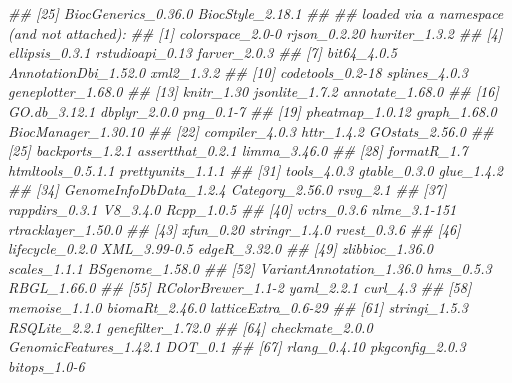 \documentclass[14pt,]{article}
\newcommand{\hlcom}[1]{\textcolor[rgb]{0.502,0.502,0.502}{\textit{#1}}}%
\newenvironment{Shaded}{\begin{myshaded}}{\end{myshaded}}
\newcommand{\DocumentationTok}[1]{\hlcom{#1}}
\begin{document}
\begin{Shaded}
\begin{Highlighting}[]
\DocumentationTok{\#\# [25] BiocGenerics\_0.36.0         BiocStyle\_2.18.1           }
\DocumentationTok{\#\# }
\DocumentationTok{\#\# loaded via a namespace (and not attached):}
\DocumentationTok{\#\#   [1] colorspace\_2.0{-}0         rjson\_0.2.20             hwriter\_1.3.2           }
\DocumentationTok{\#\#   [4] ellipsis\_0.3.1           rstudioapi\_0.13          farver\_2.0.3            }
\DocumentationTok{\#\#   [7] bit64\_4.0.5              AnnotationDbi\_1.52.0     xml2\_1.3.2              }
\DocumentationTok{\#\#  [10] codetools\_0.2{-}18         splines\_4.0.3            geneplotter\_1.68.0      }
\DocumentationTok{\#\#  [13] knitr\_1.30               jsonlite\_1.7.2           annotate\_1.68.0         }
\DocumentationTok{\#\#  [16] GO.db\_3.12.1             dbplyr\_2.0.0             png\_0.1{-}7               }
\DocumentationTok{\#\#  [19] pheatmap\_1.0.12          graph\_1.68.0             BiocManager\_1.30.10     }
\DocumentationTok{\#\#  [22] compiler\_4.0.3           httr\_1.4.2               GOstats\_2.56.0          }
\DocumentationTok{\#\#  [25] backports\_1.2.1          assertthat\_0.2.1         limma\_3.46.0            }
\DocumentationTok{\#\#  [28] formatR\_1.7              htmltools\_0.5.1.1        prettyunits\_1.1.1       }
\DocumentationTok{\#\#  [31] tools\_4.0.3              gtable\_0.3.0             glue\_1.4.2              }
\DocumentationTok{\#\#  [34] GenomeInfoDbData\_1.2.4   Category\_2.56.0          rsvg\_2.1                }
\DocumentationTok{\#\#  [37] rappdirs\_0.3.1           V8\_3.4.0                 Rcpp\_1.0.5              }
\DocumentationTok{\#\#  [40] vctrs\_0.3.6              nlme\_3.1{-}151             rtracklayer\_1.50.0      }
\DocumentationTok{\#\#  [43] xfun\_0.20                stringr\_1.4.0            rvest\_0.3.6             }
\DocumentationTok{\#\#  [46] lifecycle\_0.2.0          XML\_3.99{-}0.5             edgeR\_3.32.0            }
\DocumentationTok{\#\#  [49] zlibbioc\_1.36.0          scales\_1.1.1             BSgenome\_1.58.0         }
\DocumentationTok{\#\#  [52] VariantAnnotation\_1.36.0 hms\_0.5.3                RBGL\_1.66.0             }
\DocumentationTok{\#\#  [55] RColorBrewer\_1.1{-}2       yaml\_2.2.1               curl\_4.3                }
\DocumentationTok{\#\#  [58] memoise\_1.1.0            biomaRt\_2.46.0           latticeExtra\_0.6{-}29     }
\DocumentationTok{\#\#  [61] stringi\_1.5.3            RSQLite\_2.2.1            genefilter\_1.72.0       }
\DocumentationTok{\#\#  [64] checkmate\_2.0.0          GenomicFeatures\_1.42.1   DOT\_0.1                 }
\DocumentationTok{\#\#  [67] rlang\_0.4.10             pkgconfig\_2.0.3          bitops\_1.0{-}6            }

\end{Highlighting}
\end{Shaded}
\end{document}
